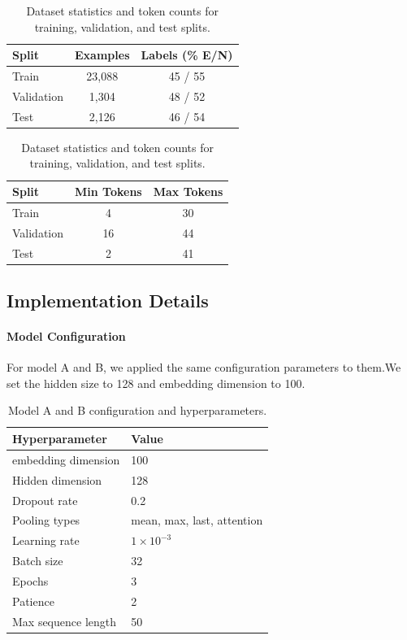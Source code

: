 \documentclass[11pt]{article}
\begin{document}
\begin{table}[H]
  \centering
  \begin{tabular}{lcc}
    \hline
    \textbf{Split} & \textbf{Examples} & \textbf{Labels (\% E/N)} \\
    \hline
    Train & 23,088 & 45 / 55 \\
    Validation & 1,304 & 48 / 52 \\
    Test & 2,126 & 46 / 54 \\
    \hline
  \end{tabular}
  \hfill
  \begin{tabular}{lcc}
    \hline
    \textbf{Split} & \textbf{Min Tokens} & \textbf{Max Tokens} \\
    \hline
    Train & 4 & 30 \\
    Validation & 16 & 44 \\
    Test & 2 & 41 \\
    \hline
  \end{tabular}
  \caption{Dataset statistics and token counts for training, validation, and test splits.}
  \label{tab:dataset_stats}
\end{table}
\subsection{Implementation Details}
\paragraph{Model Configuration}For model A and B, we applied the same configuration parameters to them.We set the hidden size to 128 and embedding dimension to 100.
\begin{table}[h]
\centering
\small
\begin{tabular}{p{2.8cm}l}
\hline
Hyperparameter & Value \\
\hline
embedding dimension & 100\\
Hidden dimension & 128 \\
Dropout rate & 0.2 \\
Pooling types & mean, max, last, attention \\
Learning rate & $1\times10^{-3}$ \\
Batch size & 32 \\
Epochs & 3 \\
Patience & 2 \\
Max sequence length & 50 \\
\hline
\end{tabular}
\caption{Model A and B configuration and hyperparameters.}
\label{tab:modelb-config}
\end{table}
\end{document}
